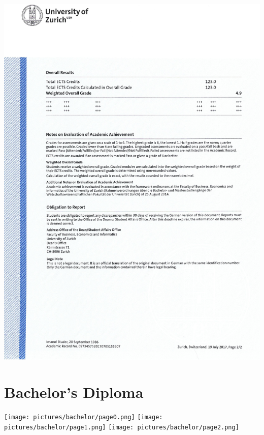 \includegraphics[width=\textwidth]{pictures/master/page2.png}

\newpage
\section{Bachelor's Diploma}
\texttt{[image: pictures/bachelor/page0.png]}
\newpage
\texttt{[image: pictures/bachelor/page1.png]}
\newpage
\texttt{[image: pictures/bachelor/page2.png]}